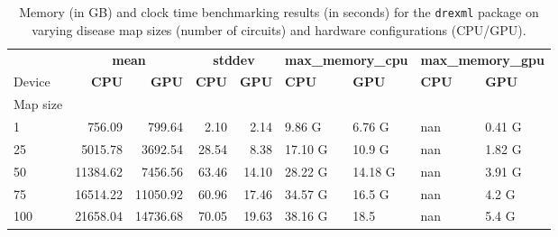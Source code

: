\begin{table}
\centering
\caption{Memory (in GB)  and clock time benchmarking results (in seconds) for the \texttt{drexml} 
    package on varying disease map sizes (number of circuits) and hardware 
    configurations (CPU/GPU).
}
\label{tab:time}
\begin{tabular}{lrrrrllll}
\toprule
 & \multicolumn{2}{c}{\textbf{mean}} & \multicolumn{2}{c}{\textbf{stddev}} & \multicolumn{2}{c}{\textbf{max\_memory\_cpu}} & \multicolumn{2}{c}{\textbf{max\_memory\_gpu}} \\
Device & \textbf{CPU} & \textbf{GPU} & \textbf{CPU} & \textbf{GPU} & \textbf{CPU} & \textbf{GPU} & \textbf{CPU} & \textbf{GPU} \\
Map size &  &  &  &  &  &  &  &  \\
\midrule
1 & 756.09 & 799.64 & 2.10 & 2.14 & 9.86 G &  6.76 G & nan &  0.41 G \\
25 & 5015.78 & 3692.54 & 28.54 & 8.38 & 17.10 G &  10.9 G & nan &  1.82 G \\
50 & 11384.62 & 7456.56 & 63.46 & 14.10 & 28.22 G &  14.18 G & nan &  3.91 G \\
75 & 16514.22 & 11050.92 & 60.96 & 17.46 & 34.57 G &  16.5 G & nan &  4.2 G \\
100 & 21658.04 & 14736.68 & 70.05 & 19.63 & 38.16 G &  18.5 & nan &  5.4 G \\
\bottomrule
\end{tabular}
\end{table}

